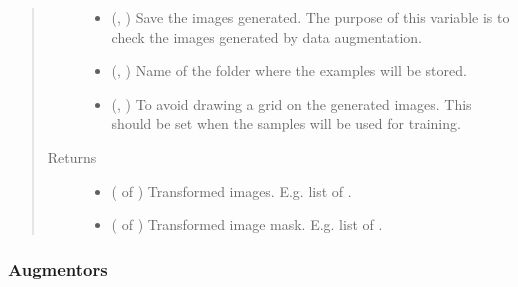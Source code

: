 \documentclass[letterpaper,10pt,english]{sphinxmanual}
\begin{document}
\begin{fulllineitems}
\begin{fulllineitems}
\begin{quote}
\begin{description}
\begin{itemize}
\item {} 
 (, ) \textendash{} Save the images generated. The purpose of this variable is to check the images generated by data
augmentation.

\item {} 
 (, ) \textendash{} Name of the folder where the examples will be stored.

\item {} 
 (, ) \textendash{} To avoid drawing a grid on the generated images. This should be set when the samples will be used for
training.

\end{itemize}

\item[{Returns}] \leavevmode
\begin{itemize}
\item {} 
 ( of ) \textendash{} Transformed images. E.g. list of .

\item {} 
 ( of ) \textendash{} Transformed image mask. E.g. list of .

\end{itemize}


\end{description}\end{quote}

\end{fulllineitems}


\end{fulllineitems}



\subsubsection{Augmentors}
\label{\detokenize{data/generators/augmentors:module-data.generators.augmentors}}\label{\detokenize{data/generators/augmentors:augmentors}}\label{\detokenize{data/generators/augmentors::doc}}
\end{document}

